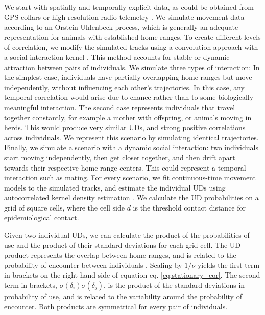 \documentclass[letterpaper]{article}
\begin{document}
We start with spatially and temporally explicit data, as could be obtained from GPS collars or high-resolution radio telemetry \citep{Aspillaga2021}. We simulate movement data according to an Orstein-Uhlenbeck process, which is generally an adequate representation for animals with established home ranges. To create different levels of correlation, we modify the simulated tracks using a convolution approach with a social interaction kernel \citep{Scharf2018}. This method accounts for stable or dynamic attraction between pairs of individuals. We simulate three types of interaction: 
In the simplest case, individuals have partially overlapping home ranges but move independently, without influencing each other's trajectories. %
In this case, any temporal correlation would arise due to chance rather than to some biologically meaningful interaction. 
The second case represents individuals that travel together constantly, for example a mother with offspring, or animals moving in herds. This would produce very similar UDs, and strong positive correlations across individuals. We represent this scenario by simulating identical trajectories.
Finally, we simulate a scenario with a dynamic social interaction: two individuals start moving independently, then get closer together, and then drift apart towards their respective home range centers. This could represent a temporal interaction such as mating.
For every scenario, we fit continuous-time movement models to the simulated tracks, and estimate the individual UDs using autocorrelated kernel density estimation \citep{Calabrese2016}. We calculate the UD probabilities on a grid of square cells, where the cell side $d$ is the threshold contact distance for epidemiological contact. 

Given two individual UDs, we can calculate the product of the probabilities of use and the product of their standard deviations for each grid cell.  The UD product represents the overlap between home ranges, and is related to the probability of encounter between individuals \citep{Noonan2021}. Scaling by $1/\nu$ yields the first term in brackets on the right hand side of equation eq. \ref{eq:stationary_cor}. 
The second term in brackets, $\sigma(\delta_i)\sigma(\delta_j)$, is the product of the standard deviations in probability of use, and is related to the variability around the probability of encounter. 
Both products are symmetrical for every pair of individuals. 
\end{document}
